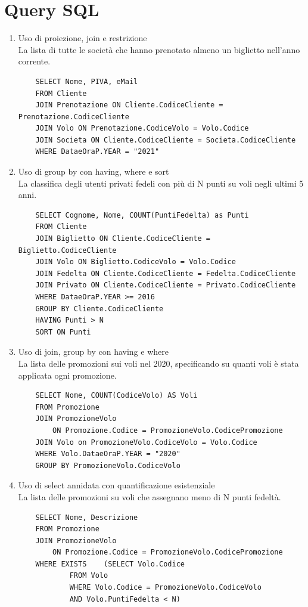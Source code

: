 \documentclass[10pt]{article}
\begin{document}
\section{Query SQL}
\begin{enumerate}
	\item Uso di proiezione, join e restrizione\\
	La lista di tutte le società che hanno prenotato almeno un biglietto nell'anno corrente.
	\begin{lstlisting}
	SELECT Nome, PIVA, eMail
	FROM Cliente
	JOIN Prenotazione ON Cliente.CodiceCliente = Prenotazione.CodiceCliente
	JOIN Volo ON Prenotazione.CodiceVolo = Volo.Codice
	JOIN Societa ON Cliente.CodiceCliente = Societa.CodiceCliente
	WHERE DataeOraP.YEAR = "2021"
	\end{lstlisting}
	\item Uso di group by con having, where e sort\\
	La classifica degli utenti privati fedeli con più di N punti su voli negli ultimi 5 anni.
	\begin{lstlisting}
	SELECT Cognome, Nome, COUNT(PuntiFedelta) as Punti
	FROM Cliente
	JOIN Biglietto ON Cliente.CodiceCliente = Biglietto.CodiceCliente
	JOIN Volo ON Biglietto.CodiceVolo = Volo.Codice
	JOIN Fedelta ON Cliente.CodiceCliente = Fedelta.CodiceCliente
	JOIN Privato ON Cliente.CodiceCliente = Privato.CodiceCliente
	WHERE DataeOraP.YEAR >= 2016
	GROUP BY Cliente.CodiceCliente
	HAVING Punti > N
	SORT ON Punti
	\end{lstlisting}
	\item Uso di join, group by con having e where\\
	La lista delle promozioni sui voli nel 2020, specificando su quanti voli è stata applicata ogni promozione.
	\begin{lstlisting}
	SELECT Nome, COUNT(CodiceVolo) AS Voli
	FROM Promozione
	JOIN PromozioneVolo
		ON Promozione.Codice = PromozioneVolo.CodicePromozione
	JOIN Volo on PromozioneVolo.CodiceVolo = Volo.Codice
	WHERE Volo.DataeOraP.YEAR = "2020"
	GROUP BY PromozioneVolo.CodiceVolo
	\end{lstlisting}
	\item Uso di select annidata con quantificazione esistenziale\\La lista delle promozioni su voli che assegnano meno di N punti fedeltà.
	\begin{lstlisting}
	SELECT Nome, Descrizione
	FROM Promozione
	JOIN PromozioneVolo
		ON Promozione.Codice = PromozioneVolo.CodicePromozione
	WHERE EXISTS	(SELECT Volo.Codice
			FROM Volo
			WHERE Volo.Codice = PromozioneVolo.CodiceVolo
			AND Volo.PuntiFedelta < N)
	\end{lstlisting}
	

\end{enumerate}
\end{document}
